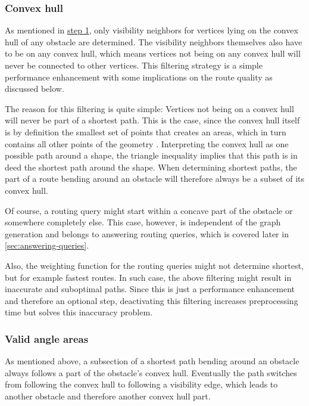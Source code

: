 		\subsubsection{Convex hull}
		\label{subsubsec:convex-hull}
			
			As mentioned in \hyperref[subsec:step-1-preprocessing]{step 1}, only visibility neighbors for vertices lying on the convex hull of any obstacle are determined.
			The visibility neighbors themselves also have to be on any convex hull, which means vertices not being on any convex hull will never be connected to other vertices.
			This filtering strategy is a simple performance enhancement with some implications on the route quality as discussed below.
			
			The reason for this filtering is quite simple:
			Vertices not being on a convex hull will never be part of a shortest path.
			This is the case, since the convex hull itself is by definition the smallest set of points that creates an areas, which in turn contains all other points of the geometry \cite[2]{de-berg-computational-geometry}.
			Interpreting the convex hull as one possible path around a shape, the triangle inequality implies that this path is in deed the shortest path around the shape.
			When determining shortest paths, the part of a route bending around an obstacle will therefore always be a subset of its convex hull.
			
			Of course, a routing query might start within a concave part of the obstacle or somewhere completely else.
			This case, however, is independent of the graph generation and belongs to answering routing queries, which is covered later in \cref{sec:answering-queries}.
			
			Also, the weighting function for the routing queries might not determine shortest, but for example fastest routes.
			In such case, the above filtering might result in inaccurate and suboptimal paths.
			Since this is just a performance enhancement and therefore an optional step, deactivating this filtering increases preprocessing time but solves this inaccuracy problem.
						
		\subsubsection{Valid angle areas}
			
			As mentioned above, a subsection of a shortest path bending around an obstacle always follows a part of the obstacle's convex hull.
			Eventually the path switches from following the convex hull to following a visibility edge, which leads to another obstacle and therefore another convex hull part.
			
